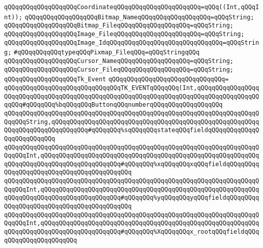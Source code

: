 \verb|qQQqqQQqqQQqqQQqqQQqCoordinateqQQqqQQqqQQqqQQqqQQqqQQq=qQQq((Int,qQQqInt));|\newline
\verb|qQQqqQQqqQQqqQQqqQQqBitmap_NameqQQqqQQqqQQqqQQqqQQq=qQQqString;|\newline
\verb|qQQqqQQqqQQqqQQqqQQqBitmap_FileqQQqqQQqqQQqqQQqqQQq=qQQqString;|\newline
\verb|qQQqqQQqqQQqqQQqqQQqImage_FileqQQqqQQqqQQqqQQqqQQqqQQq=qQQqString;|\newline
\verb|qQQqqQQqqQQqqQQqqQQqImage_IdqQQqqQQqqQQqqQQqqQQqqQQqqQQqqQQq=qQQqString;|\newline
\verb|#qQQqqQQqqQQqtypeqQQqPixmap_FileqQQq=qQQqStringqQQq|\newline
\verb|qQQqqQQqqQQqqQQqqQQqCursor_NameqQQqqQQqqQQqqQQqqQQq=qQQqString;|\newline
\verb|qQQqqQQqqQQqqQQqqQQqCursor_FileqQQqqQQqqQQqqQQqqQQq=qQQqString;|\newline
\newline
\newline
\verb|qQQqqQQqqQQqqQQqqQQqTk_Event|\newline
\verb|qQQqqQQqqQQqqQQqqQQqqQQqqQQqqQQq=|\newline
\verb|qQQqqQQqqQQqqQQqqQQqqQQqqQQqqQQqTK_EVENTqQQqqQQq(Int,qQQqqQQqqQQqqQQqqQQqqQQqqQQqqQQqqQQqqQQqqQQqqQQqqQQqqQQqqQQqqQQqqQQqqQQqqQQqqQQqqQQqqQQqqQQq#qQQqqQQq%bqQQqqQQqButtonqQQqnumberqQQqqQQqqQQqqQQqqQQq|\newline
\verb|qQQqqQQqqQQqqQQqqQQqqQQqqQQqqQQqqQQqqQQqqQQqqQQqqQQqqQQqqQQqqQQqqQQqqQQqqQQqString,qQQqqQQqqQQqqQQqqQQqqQQqqQQqqQQqqQQqqQQqqQQqqQQqqQQqqQQqqQQqqQQqqQQqqQQqqQQqqQQq#qQQqqQQq%sqQQqqQQqstateqQQqfieldqQQqqQQqqQQqqQQqqQQqqQQqqQQq|\newline
\verb|qQQqqQQqqQQqqQQqqQQqqQQqqQQqqQQqqQQqqQQqqQQqqQQqqQQqqQQqqQQqqQQqqQQqqQQqqQQqInt,qQQqqQQqqQQqqQQqqQQqqQQqqQQqqQQqqQQqqQQqqQQqqQQqqQQqqQQqqQQqqQQqqQQqqQQqqQQqqQQqqQQqqQQqqQQq#qQQqqQQq%xqQQqqQQqxqQQqfieldqQQqqQQqqQQqqQQqqQQqqQQqqQQqqQQqqQQqqQQqqQQq|\newline
\verb|qQQqqQQqqQQqqQQqqQQqqQQqqQQqqQQqqQQqqQQqqQQqqQQqqQQqqQQqqQQqqQQqqQQqqQQqqQQqInt,qQQqqQQqqQQqqQQqqQQqqQQqqQQqqQQqqQQqqQQqqQQqqQQqqQQqqQQqqQQqqQQqqQQqqQQqqQQqqQQqqQQqqQQqqQQq#qQQqqQQq%yqQQqqQQqyqQQqfieldqQQqqQQqqQQqqQQqqQQqqQQqqQQqqQQqqQQqqQQqqQQq|\newline
\verb|qQQqqQQqqQQqqQQqqQQqqQQqqQQqqQQqqQQqqQQqqQQqqQQqqQQqqQQqqQQqqQQqqQQqqQQqqQQqInt,qQQqqQQqqQQqqQQqqQQqqQQqqQQqqQQqqQQqqQQqqQQqqQQqqQQqqQQqqQQqqQQqqQQqqQQqqQQqqQQqqQQqqQQqqQQq#qQQqqQQq%XqQQqqQQqx_rootqQQqfieldqQQqqQQqqQQqqQQqqQQqqQQq|\newline
